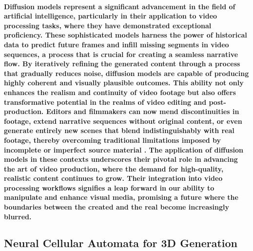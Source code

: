 \documentclass[11pt,a4paper,oneside]{report}
\begin{document}
\paragraph{Diffusion models represent a significant advancement in the field of artificial intelligence, particularly in their application to video processing tasks, where they have demonstrated exceptional proficiency. These sophisticated models harness the power of historical data to predict future frames and infill missing segments in video sequences, a process that is crucial for creating a seamless narrative flow. By iteratively refining the generated content through a process that gradually reduces noise, diffusion models are capable of producing highly coherent and visually plausible outcomes. This ability not only enhances the realism and continuity of video footage but also offers transformative potential in the realms of video editing and post-production. Editors and filmmakers can now mend discontinuities in footage, extend narrative sequences without original content, or even generate entirely new scenes that blend indistinguishably with real footage, thereby overcoming traditional limitations imposed by incomplete or imperfect source material \cite{hoppe2022diffusion}. The application of diffusion models in these contexts underscores their pivotal role in advancing the art of video production, where the demand for high-quality, realistic content continues to grow. Their integration into video processing workflows signifies a leap forward in our ability to manipulate and enhance visual media, promising a future where the boundaries between the created and the real become increasingly blurred.
}

\subsection{Neural Cellular Automata for 3D Generation}
\end{document}
